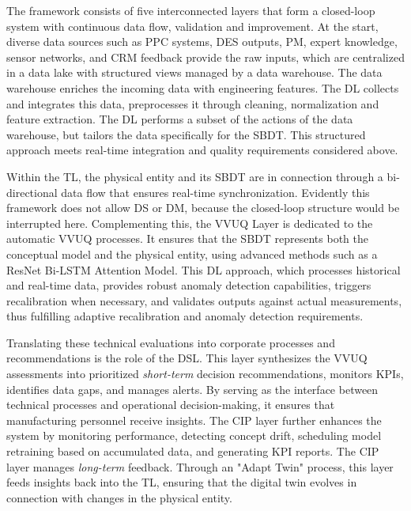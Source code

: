 The framework consists of five interconnected layers that form a closed-loop system with continuous data flow, validation and improvement. At the start, diverse data sources such as PPC systems, DES outputs, PM, expert knowledge, sensor networks, and CRM feedback provide the raw inputs, which are centralized in a data lake with structured views managed by a data warehouse. The data warehouse enriches the incoming data with engineering features. The DL collects and integrates this data, preprocesses it through cleaning, normalization and feature extraction. The DL performs a subset of the actions of the data warehouse, but tailors the data specifically for the SBDT. This structured approach meets real-time integration and quality requirements considered above.

Within the TL, the physical entity and its SBDT are in connection through a bi-directional data flow that ensures real-time synchronization. Evidently this framework does not allow DS or DM, because the closed-loop structure would be interrupted here. Complementing this, the VVUQ Layer is dedicated to the automatic VVUQ processes. It ensures that the SBDT represents both the conceptual model and the physical entity, using advanced methods such as a ResNet Bi-LSTM Attention Model. This DL approach, which processes historical and real-time data, provides robust anomaly detection capabilities, triggers recalibration when necessary, and validates outputs against actual measurements, thus fulfilling adaptive recalibration and anomaly detection requirements.

Translating these technical evaluations into corporate processes and recommendations is the role of the DSL. This layer synthesizes the VVUQ assessments into prioritized \textit{short-term} decision recommendations, monitors KPIs, identifies data gaps, and manages alerts. By serving as the interface between technical processes and operational decision-making, it ensures that manufacturing personnel receive insights. The CIP layer further enhances the system by monitoring performance, detecting concept drift, scheduling model retraining based on accumulated data, and generating KPI reports. The CIP layer manages \textit{long-term} feedback. Through an "Adapt Twin" process, this layer feeds insights back into the TL, ensuring that the digital twin evolves in connection with changes in the physical entity.

